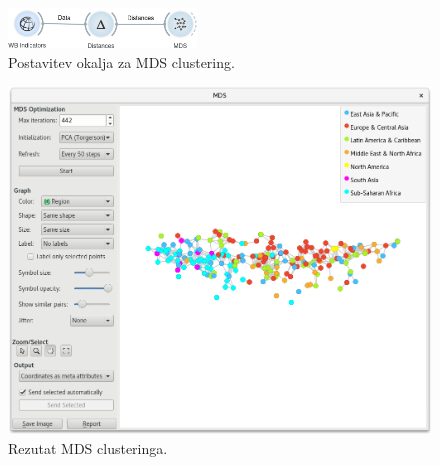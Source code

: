 \begin{figure}
\begin{center}
\includegraphics[width=5cm]{pic/cluster_setup.png}
\end{center}
\caption{Postavitev okalja za MDS clustering.}
\label{cluster_indicators}
\end{figure} 

\begin{figure}
\begin{center}
\includegraphics[width=12cm]{pic/cluster_mds_result.png}
\end{center}
\caption{Rezutat MDS clusteringa.}
\label{cluster_indicators}
\end{figure} 




